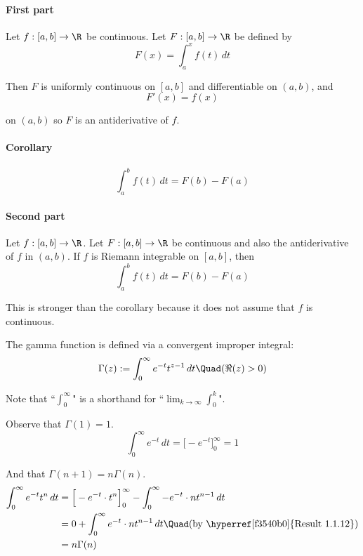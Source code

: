 \label{b869dc0}

\paragraph{First part} Let $f:[a,b]\to\R$ be continuous. Let
$F:[a,b]\to\R$ be defined by
$$F(x)=\int_a^xf(t)\,dt$$

Then $F$ is uniformly continuous on $[a,b]$ and differentiable on
$(a,b)$, and
$$F'(x)=f(x)$$

on $(a,b)$ so $F$ is an antiderivative of $f$.

\paragraph{Corollary}
$$\int_a^bf(t)\,dt=F(b)-F(a)$$

\paragraph{Second part} Let $f:[a,b]\to\R$. Let $F:[a,b]\to\R$ be
continuous and also the antiderivative of $f$ in $(a,b)$. If $f$ is
Riemann integrable on $[a,b]$, then
$$\int_a^bf(t)\,dt=F(b)-F(a)$$

This is stronger than the corollary because it does not assume that
$f$ is continuous.


The gamma function is defined via a convergent improper integral:
$$
	\Gamma(z):=\int_0^\infty e^{-t}t^{z-1}\,dt\Quad(\Re(z)>0)
$$

Note that ``$\displaystyle\int_0^\infty$" is a shorthand for
``$\displaystyle\lim_{k\to\infty}\int_0^k$".

Observe that $\Gamma(1)=1$.
$$\int_0^\infty e^{-t}\,dt=\Big[-e^{-t}\Big]_0^\infty=1$$

And that $\Gamma(n+1)=n\Gamma(n)$.
\begin{align*}
	\int_0^\infty e^{-t}t^n\,dt
	 & = \Big[-e^{-t}\cdot t^n\Big]_0^\infty-\int_0^\infty-e^{-t}\cdot nt^{n-1}\,dt \\
   & = 0+\int_0^\infty e^{-t}\cdot nt^{n-1}\,dt \Quad\text{(by \hyperref[f3540b0]{Result 1.1.12})} \\
	 & = n\Gamma(n)
\end{align*}
